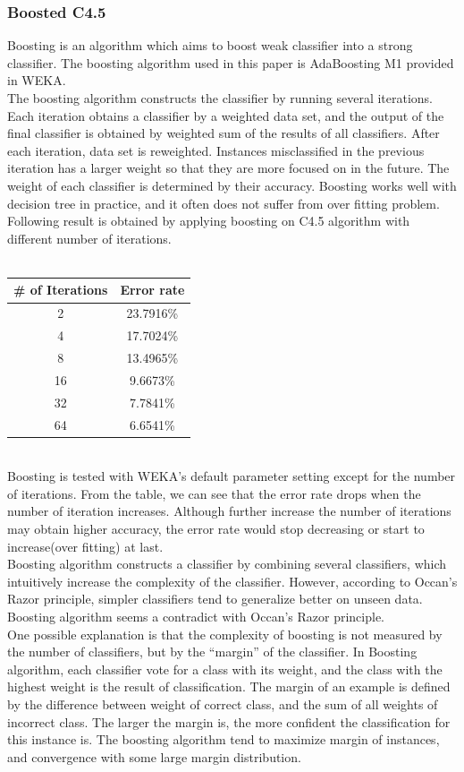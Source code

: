 \documentclass[a4paper,11pt]{article}
\begin{document}
\subsubsection{Boosted C4.5}
Boosting is an algorithm which aims to boost weak classifier into a strong classifier. The boosting algorithm used in this paper is AdaBoosting M1 provided in WEKA.\\
The boosting algorithm constructs the classifier by running several iterations. Each iteration obtains a classifier by a weighted data set, and the output of the final classifier is obtained by weighted sum of the results of all classifiers. After each iteration, data set is reweighted. Instances misclassified in the previous iteration has a larger weight so that they are more focused on in the future. The weight of each classifier is determined by their accuracy. Boosting works well with decision tree in practice, and it often does not suffer from over fitting problem.\\
Following result is obtained by applying boosting on C4.5 algorithm with different number of iterations.\\
\vspace{0.5cm}\\
\begin{tabular}{c c}
\# of Iterations	& Error rate\\
\hline \hline
	2		& 23.7916\%\\
	4		& 17.7024\%\\
	8		& 13.4965\%\\
	16		& 9.6673\%\\
    32      & 7.7841\%\\
    64      & 6.6541\%\\
\end{tabular}
\vspace{0.5cm}\\
Boosting is tested with WEKA's default parameter setting except for the number of iterations. From the table, we can see that the error rate drops when the number of iteration increases. Although further increase the number of iterations may obtain higher accuracy, the error rate would stop decreasing or start to increase(over fitting) at last.\\
Boosting algorithm constructs a classifier by combining several classifiers, which intuitively increase the complexity of the classifier. However, according to Occan's Razor principle, simpler classifiers tend to generalize better on unseen data. Boosting algorithm seems a contradict with Occan's Razor principle.\\
One possible explanation is that the complexity of boosting is not measured by the number of classifiers, but by the ``margin'' of the classifier.
In Boosting algorithm, each classifier vote for a class with its weight, and the class with the highest weight is the result of classification. The margin of an example is defined by the difference between weight of correct class, and the sum of all weights of incorrect class. The larger the margin is, the more confident the classification for this instance is. The boosting algorithm tend to maximize margin of instances, and convergence with some large margin distribution\cite{boosting}.\\
\end{document}
